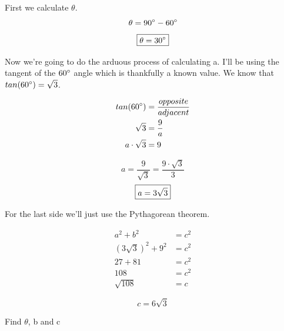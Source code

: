 \documentclass[10pt,letterpaper]{amspset}
\begin{document}
\begin{solution}


First we calculate $\theta$.
\[\theta = 90\degree - 60\degree\]
\[\boxed{\theta = 30\degree}\]

Now we're going to do the arduous process of calculating a. I'll be using the tangent of the $60\degree$ angle which is thankfully a known value. We know that $tan(60\degree) = \sqrt{3}$. 

\begin{align}
    tan(60\degree) &= \frac{opposite}{adjacent} \\
    \sqrt{3} &= \frac{9}{a} \\
    a \cdot \sqrt{3} &= 9
\end{align}

\[a = \frac{9}{\sqrt{3}} = \frac{9 \cdot \sqrt{3}}{3}\]
\[\boxed{a = 3\sqrt{3}} \\\]

For the last side we'll just use the Pythagorean theorem. 

\begin{align}
a^2 + b^2 &= c^2 \\
(3\sqrt{3})^2 + 9^2 &= c^2 \\
27 + 81 &= c^2 \\
108 &= c^2 \\
\sqrt{108} &= c
\end{align}

\[\boxed{c = 6\sqrt{3}}\]

\end{solution}


\pagebreak


\begin{problem}[67]
Find $\theta$, b and c
\end{problem}
\end{document}

